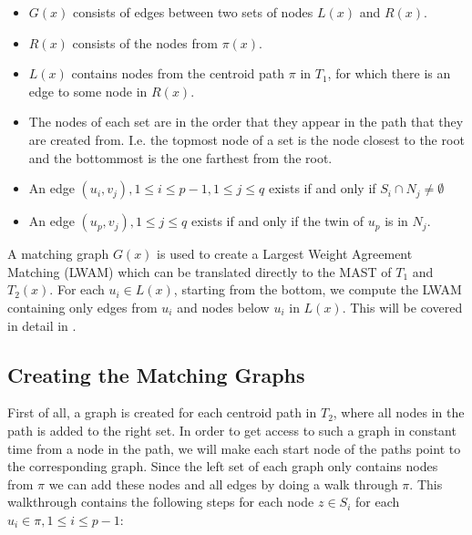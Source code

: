 \begin{itemize}
	\item $G(x)$ consists of edges between two sets of nodes $L(x)$ and $R(x)$.
	\item $R(x)$ consists of the nodes from $\pi(x)$.
	\item $L(x)$ contains nodes from the centroid path $\pi$ in $T_1$, for which there is an edge to some node in $R(x)$.
	\item The nodes of each set are in the order that they appear in the path that they are created from. I.e. the topmost node of a set is the node closest to the root and the bottommost is the one farthest from the root.
	\item An edge $(u_i, v_j), 1 \le i \le p-1, 1 \le j \le q$ exists if and only if $S_i \cap N_j \ne \emptyset$
	\item An edge $(u_p, v_j), 1 \le j \le q$ exists if and only if the twin of $u_p$ is in $N_j$.
\end{itemize}

A matching graph $G(x)$ is used to create a Largest Weight Agreement Matching (LWAM) which can be translated directly to the MAST of $T_1$ and $T_2(x)$. For each $u_i \in L(x)$, starting from the bottom, we compute the LWAM containing only edges from $u_i$ and nodes below $u_i$ in $L(x)$. This will be covered in detail in .

\subsection{Creating the Matching Graphs}
First of all, a graph is created for each centroid path in $T_2$, where all nodes in the path is added to the right set. In order to get access to such a graph in constant time from a node in the path, we will make each start node of the paths point to the corresponding graph.
Since the left set of each graph only contains nodes from $\pi$ we can add these nodes and all edges by doing a walk through $\pi$. This walkthrough contains the following steps for each node $z \in S_i$ for each $u_i \in \pi, 1 \le i \le p-1$:


